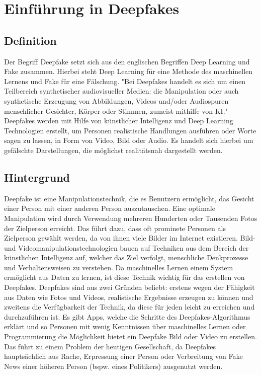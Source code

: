 \chapter{Einführung in Deepfakes}
\section{Definition}
Der Begriff Deepfake setzt sich aus den englischen Begriffen Deep Learning und Fake zusammen. Hierbei steht Deep Learning für eine Methode des maschinellen Lernens und Fake für eine Fälschung.\newline
"Bei Deepfakes handelt es sich um einen Teilbereich synthetischer audiovisueller Medien: die Manipulation oder auch synthetische Erzeugung von Abbildungen, Videos und/oder Audiospuren menschlicher Gesichter, Körper oder Stimmen, zumeist mithilfe von KI."\cite{SpringerLink}
\cite{SpringerLink}
\newline
Deepfakes werden mit Hilfe von künstlicher Intelligenz und Deep Learning Technologien erstellt, um Personen realistische Handlungen ausführen oder Worte sagen zu lassen, in Form von Video, Bild oder Audio. Es handelt sich hierbei um gefälschte Darstellungen, die möglichst realitätsnah dargestellt werden.\cite{ScienceDirect}

\section{Hintergrund}
Deepfake ist eine Manipulationstechnik, die es Benutzern ermöglicht, das Gesicht einer Person mit einer anderen Person auszutauschen. Eine optimale Manipulation wird durch Verwendung mehreren Hunderten oder Tausenden Fotos der Zielperson erreicht. Das führt dazu, dass oft prominete Personen als Zielperson gewählt werden, da von ihnen viele Bilder im Internet existieren.\newline
Bild- und Videomanipulationstechnologien bauen auf Techniken aus dem Bereich der künstlichen Intelligenz auf, welcher das Ziel verfolgt, menschliche Denkprozesse und Verhaltensweisen zu verstehen.
Da maschinelles Lernen einem System ermöglicht aus Daten zu lernen, ist diese Technik wichtig für das erstellen von Deepfakes. \newline
Deepfakes sind aus zwei Gründen beliebt: erstens wegen der Fähigkeit aus Daten wie Fotos und Videos, realistische Ergebnisse erzeugen zu können und zweitens die Verfügbarkeit der Technik, da diese für jeden leicht zu erreichen und durchzuführen ist.
Es gibt Apps, welche die Schritte des Deepfakes-Algorithmus erklärt und so Personen mit wenig Kenntnissen über maschinelles Lernen oder Programmierung die Möglichkeit bietet ein Deepfake Bild oder Video zu erstellen. \newline
Das führt zu einem Problem der heutigen Gesellschaft, da Deepfakes hauptsächlich aus Rache, Erpressung einer Person oder Verbreitung von Fake News einer höheren Person (bspw. eines Politikers) ausgenutzt werden.\cite{Jatit}

